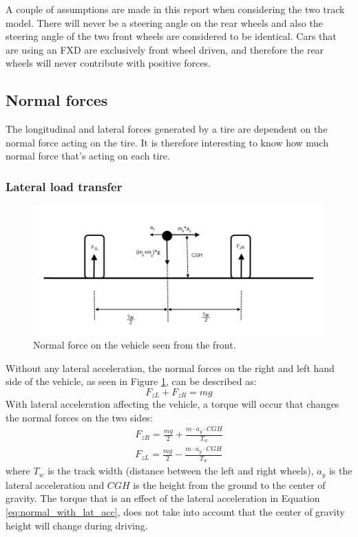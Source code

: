 A couple of assumptions are made in this report when considering the two track model. There will never be a steering angle on the rear wheels and also the steering angle of the two front wheels are considered to be identical. Cars that are using an FXD are exclusively front wheel driven, and therefore the rear wheels will never contribute with positive forces. 



\subsection{Normal forces}
\label{normal_force}
The longitudinal and lateral forces generated by a tire are dependent on the normal force acting on the tire. It is therefore interesting to know how much normal force that's acting on each tire.
\subsubsection{Lateral load transfer}
\begin{figure}[h]
	\centering
	\includegraphics[width=1\textwidth]{Pictures/normal_force_lateral}
	\caption{Normal force on the vehicle seen from the front.}
	\label{normal_force_lateral}
\end{figure}
Without any lateral acceleration, the normal forces on the right and left hand side of the vehicle, as seen in Figure  \ref{normal_force_lateral}, can be described as:
\begin{equation} \label{eq:normal}
	F_{zL} + F_{zR} = mg
\end{equation}
With lateral acceleration affecting the vehicle, a torque will occur that changes the normal forces on the two sides: 
\begin{equation} \label{eq:normal_with_lat_acc}
\begin{split}
	F_{zR} = \frac{mg}{2} + \frac{m\cdot a_{y}\cdot CGH}{T_{w}} \\
	F_{zL} = \frac{mg}{2} - \frac{m\cdot a_{y}\cdot CGH}{T_{w}}
\end{split}
\end{equation}
where $ T_{w} $ is the track width (distance between the left and right wheels), $ a_{y} $ is the lateral acceleration and $ CGH $ is the height from the ground to the center of gravity. The torque that is an effect of the lateral acceleration in Equation \ref{eq:normal_with_lat_acc}, does not take into account that the center of gravity height will change during driving.

